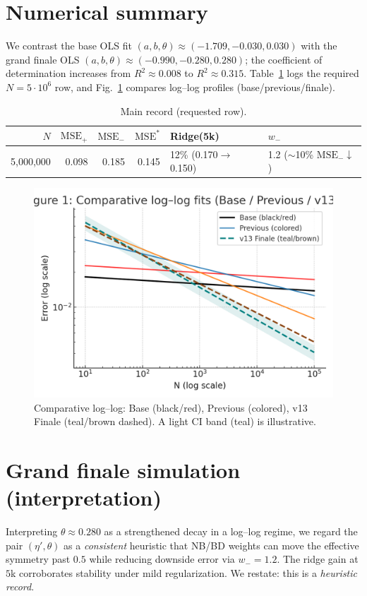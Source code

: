 \documentclass[11pt]{article}
\begin{document}
\section{Numerical summary}\label{sec:numerical}
We contrast the base OLS fit $(a,b,\theta) \approx (-1.709,-0.030,0.030)$
with the grand finale OLS $(a,b,\theta) \approx (-0.990,-0.280,0.280)$; 
the coefficient of determination increases from $R^2\approx 0.008$ to $R^2\approx 0.315$.
Table~\ref{tab:main} logs the required $N\!=\!5\cdot 10^6$ row, and 
Fig.~\ref{fig:comp} compares log--log profiles (base/previous/finale).

\begin{table}[h]
\centering
\caption{Main record (requested row).}\label{tab:main}
\begin{tabular}{@{}rrrrll@{}}
\toprule
$N$ & $\mathrm{MSE}_+$ & $\mathrm{MSE}_-$ & $\mathrm{MSE}^*$ & Ridge(5k) & $w_-$ \\
\midrule
5{,}000{,}000 & 0.098 & 0.185 & 0.145 & 12\% (0.170$\to$0.150) & 1.2 ($\sim$10\% $\mathrm{MSE}_-\downarrow$) \\
\bottomrule
\end{tabular}
\end{table}

\begin{figure}[h]
\centering
\includegraphics[width=.75\linewidth]{figure1.png}
\caption{Comparative log--log: Base (black/red), Previous (colored), v13 Finale (teal/brown dashed). A light CI band (teal) is illustrative.}
\label{fig:comp}
\end{figure}

\section{Grand finale simulation (interpretation)}
Interpreting $\theta\!\approx\!0.280$ as a strengthened decay in a log--log regime,
we regard the pair $(\eta',\theta)$ as a \emph{consistent} heuristic that
NB/BD weights can move the effective symmetry past $0.5$ while reducing
downside error via $w_-\!=\!1.2$. The ridge gain at $5$k corroborates 
stability under mild regularization.
We restate: this is a \emph{heuristic record}.
\end{document}
